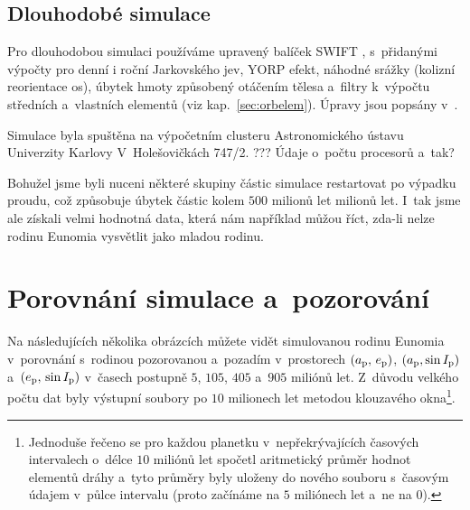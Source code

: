 \documentclass[A4paper, 12pt, oneside]{book}
\begin{document}
\subsection{Dlouhodobé simulace}
Pro dlouhodobou simulaci používáme upravený balíček SWIFT \cite{levison94}, s~přidanými výpočty pro denní i roční Jarkovského jev, YORP efekt, náhodné srážky (kolizní reorientace os), úbytek hmoty způsobený otáčením tělesa a~filtry k~výpočtu středních a~vlastních elementů (viz kap.~\ref{sec:orbelem}). Úpravy jsou popsány v~\cite{broz11}.

Simulace byla spuštěna na výpočetním clusteru Astronomického ústavu Univerzity Karlovy V~Holešovičkách 747/2. ??? Údaje o~počtu procesorů a~tak?

Bohužel jsme byli nuceni některé skupiny částic simulace restartovat po výpadku proudu, což způsobuje úbytek částic kolem $500$ milionů let milionů let. I~tak jsme ale získali velmi hodnotná data, která nám například můžou říct, zda-li nelze rodinu Eunomia vysvětlit jako mladou rodinu.

\section{Porovnání simulace a~pozorování}

Na následujících několika obrázcích můžete vidět simulovanou rodinu Eunomia v~porovnání s~rodinou pozorovanou a~pozadím v~prostorech $(a_{\rm p},\,e_{\rm p})$, $(a_{\rm p}, \sin I_{\rm p})$ a~$(e_{\rm p},\,\sin I_{\rm p})$ v~časech postupně $5$, $105$, $405$ a~$905$ miliónů let. Z~důvodu velkého počtu dat byly výstupní soubory  po $10$ milionech let metodou klouzavého okna\footnote{Jednoduše řečeno se pro každou planetku v~nepřekrývajících časových intervalech o~délce $10$ miliónů let spočetl aritmetický průměr hodnot elementů dráhy a~tyto průměry byly uloženy do nového souboru s~časovým údajem v~půlce intervalu (proto začínáme na $5$ miliónech let a~ne na $0$).}.
\end{document}
